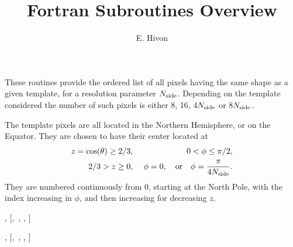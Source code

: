 
\sloppy


\title{\healpix Fortran Subroutines Overview}
 \section[same\_shape\_pixels\_nest, same\_shape\_pixels\_ring]{ }
\label{sub:same_shape_pixels_xxx}
\author{E. Hivon}

\begin{facility}
{These routines provide the ordered list of all \healpix pixels having the same shape
  as a given template, for a resolution parameter ${N_{\rm side}}$. Depending on the
  template considered the number of such pixels is either 8, 16, 4${N_{\rm side}}$ or
  8${N_{\rm side}}$.


The template pixels are all located in the Northern Hemisphere, or on the
 Equator.
They are chosen to have their center located at
\begin{eqnarray}
     z=\cos(\theta)\ge 2/3,  &\ &    0< \phi \leq \pi/2,   \nonumber\\            %
     2/3 > z \geq 0,  &\ & \phi=0, \quad{\rm or}\quad  \phi=\frac{\pi}{4\nside}.  \nonumber %
\myhtmlimage{}
\end{eqnarray}
 They are numbered continuously from 0, starting at the North Pole, with the index
 increasing in $\phi$, and then increasing for decreasing $z$.
}
{\modPixTools}
\end{facility}

\begin{f90format}
{%
 , 
[,~, 
 , 
 ]}
\end{f90format}
\begin{f90format}
{%
 , 
[,~, 
 , 
 ]}
\end{f90format}

